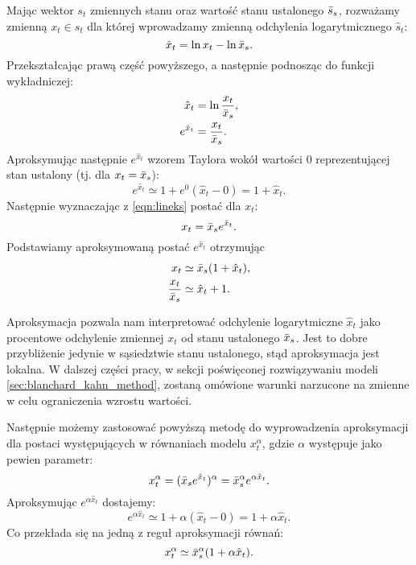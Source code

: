Mając wektor $s_t$ zmiennych stanu oraz wartość stanu ustalonego $\bar{s}_s$, rozważamy zmienną $x_t \in s_t$ dla której wprowadzamy zmienną odchylenia logarytmicznego $\hat{s}_t$:
\begin{equation}
\label{eqn:linbase}
    \hat{x}_t = \ln x_t - \ln \bar{x}_s.
\end{equation}
Przekształcając prawą część powyższego, a następnie podnosząc do funkcji wykładniczej:
\begin{align}
    \label{eqn:lineks}
    \hat{x}_t &= \ln \frac{x_t}{\bar{x}_s}, \\
    e^{\hat{x}_t} &= \frac{x_t}{\bar{x}_s}.
\end{align}
Aproksymując następnie $e^{\hat{x}_t}$ wzorem Taylora wokół wartości $0$ reprezentującej stan ustalony (tj. dla $x_t = \bar{x}_s$):
\begin{equation}
    e^{\hat{x}_t} \simeq 1 + e^0(\hat{x}_t - 0) = 1 + \hat{x}_t.
\end{equation}
Następnie wyznaczając z \ref{eqn:lineks} postać dla $x_t$:
\begin{equation}
    x_t = \bar{x}_s e^{\hat{x}_t}.
\end{equation}
Podstawiamy aproksymowaną postać $e^{\hat{x}_t}$ otrzymując
\begin{align}
    x_t &\simeq \bar{x}_s(1+\hat{x}_t),\\
    \frac{x_t}{\bar{x}_s} &\simeq \hat{x}_t + 1.
\end{align}

Aproksymacja pozwala nam interpretować odchylenie logarytmiczne $\hat{x}_t$ jako procentowe odchylenie zmiennej $x_t$ od stanu ustalonego $\bar{x}_s$.
Jest to dobre przybliżenie jedynie w sąsiedztwie stanu ustalonego, stąd aproksymacja jest lokalna. W dalszej części pracy, w sekcji poświęconej rozwiązywaniu modeli \ref{sec:blanchard_kahn_method}, zostaną omówione warunki narzucone na zmienne w celu ograniczenia wzrostu wartości.

Następnie możemy zastosować powyższą metodę do wyprowadzenia aproksymacji dla postaci występujących w równaniach modelu $x_t^\alpha$, gdzie $\alpha$ występuje jako pewien parametr:
\begin{equation}
    x_t^\alpha = (\bar{x}_se^{\hat{x}_t})^\alpha = \bar{x}_s^\alpha e^{\alpha\hat{x}_t}.
\end{equation}
Aproksymując $e^{\alpha\hat{x}_t}$ dostajemy:
\begin{equation}
    e^{\alpha\hat{x}_t} \simeq 1 + \alpha(\hat{x}_t - 0) = 1 + \alpha\hat{x}_t.
\end{equation}
Co przekłada się na jedną z reguł aproksymacji równań:
\begin{equation}
    x_t^\alpha \simeq \bar{x}_s^\alpha(1 + \alpha\hat{x}_t).
\end{equation}

